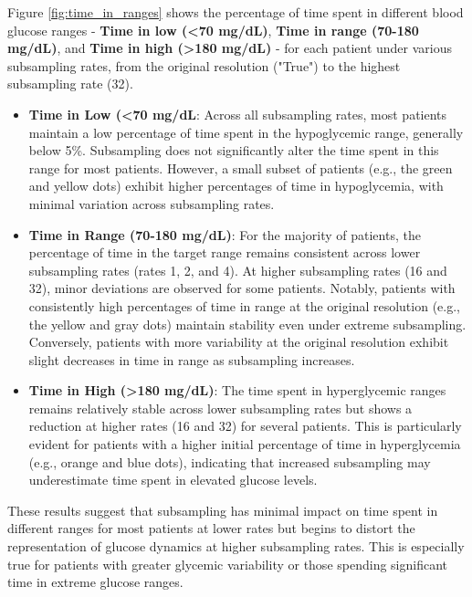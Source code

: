 Figure \ref{fig:time_in_ranges} shows the percentage of time spent in different blood glucose ranges - \textbf{Time in low (<70 mg/dL)}, \textbf{Time in range (70-180 mg/dL)},  and \textbf{Time in high (>180 mg/dL)} - for each patient under various subsampling rates, from the original resolution ("True") to the highest subsampling rate (32). 
\begin{itemize}
	\item \textbf{Time in Low (<70 mg/dL}: Across all subsampling rates, most patients maintain a low percentage of time spent in the hypoglycemic range, generally below 5\%. Subsampling does not significantly alter the time spent in this range for most patients. However, a small subset of patients (e.g., the green and yellow dots) exhibit higher percentages of time in hypoglycemia, with minimal variation across subsampling rates.
	\item \textbf{Time in Range (70-180 mg/dL)}: For the majority of patients, the percentage of time in the target range remains consistent across lower subsampling rates (rates 1, 2, and 4). At higher subsampling rates (16 and 32), minor deviations are observed for some patients. Notably, patients with consistently high percentages of time in range at the original resolution (e.g., the yellow and gray dots) maintain stability even under extreme subsampling. Conversely, patients with more variability at the original resolution exhibit slight decreases in time in range as subsampling increases.
	\item \textbf{Time in High (>180 mg/dL)}: The time spent in hyperglycemic ranges remains relatively stable across lower subsampling rates but shows a reduction at higher rates (16 and 32) for several patients. This is particularly evident for patients with a higher initial percentage of time in hyperglycemia (e.g., orange and blue dots), indicating that increased subsampling may underestimate time spent in elevated glucose levels.
\end{itemize}
These results suggest that subsampling has minimal impact on time spent in different ranges for most patients at lower rates but begins to distort the representation of glucose dynamics at higher subsampling rates. This is especially true for patients with greater glycemic variability or those spending significant time in extreme glucose ranges.
